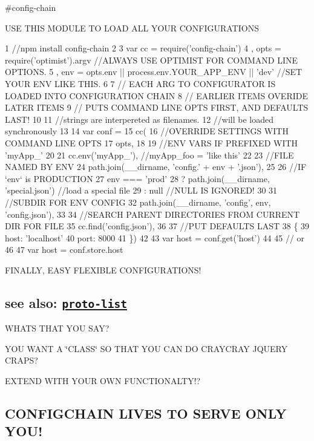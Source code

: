 \#config-\/chain

U\+S\+E T\+H\+I\+S M\+O\+D\+U\+L\+E T\+O L\+O\+A\+D A\+L\+L Y\+O\+U\+R C\+O\+N\+F\+I\+G\+U\+R\+A\+T\+I\+O\+N\+S


\begin{DoxyCode}
1 //npm install config-chain
2 
3 var cc = require('config-chain')
4   , opts = require('optimist').argv //ALWAYS USE OPTIMIST FOR COMMAND LINE OPTIONS.
5   , env = opts.env || process.env.YOUR\_APP\_ENV || 'dev' //SET YOUR ENV LIKE THIS.
6 
7 // EACH ARG TO CONFIGURATOR IS LOADED INTO CONFIGURATION CHAIN
8 // EARLIER ITEMS OVERIDE LATER ITEMS
9 // PUTS COMMAND LINE OPTS FIRST, AND DEFAULTS LAST!
10 
11 //strings are interpereted as filenames.
12 //will be loaded synchronously
13 
14 var conf =
15 cc(
16   //OVERRIDE SETTINGS WITH COMMAND LINE OPTS
17   opts,
18 
19   //ENV VARS IF PREFIXED WITH 'myApp\_'
20 
21   cc.env('myApp\_'), //myApp\_foo = 'like this'
22 
23   //FILE NAMED BY ENV
24   path.join(\_\_dirname,  'config.' + env + '.json'),
25 
26   //IF `env` is PRODUCTION
27   env === 'prod'
28     ? path.join(\_\_dirname, 'special.json') //load a special file
29     : null //NULL IS IGNORED!
30 
31   //SUBDIR FOR ENV CONFIG
32   path.join(\_\_dirname,  'config', env, 'config.json'),
33 
34   //SEARCH PARENT DIRECTORIES FROM CURRENT DIR FOR FILE
35   cc.find('config.json'),
36 
37   //PUT DEFAULTS LAST
38   \{
39     host: 'localhost'
40     port: 8000
41   \})
42 
43 var host = conf.get('host')
44 
45 // or
46 
47 var host = conf.store.host
\end{DoxyCode}


F\+I\+N\+A\+L\+L\+Y, E\+A\+S\+Y F\+L\+E\+X\+I\+B\+L\+E C\+O\+N\+F\+I\+G\+U\+R\+A\+T\+I\+O\+N\+S!

\subsection*{see also\+: \href{https://github.com/isaacs/proto-list/}{\tt proto-\/list}}

W\+H\+A\+T\+S T\+H\+A\+T Y\+O\+U S\+A\+Y?

Y\+O\+U W\+A\+N\+T A \char`\"{}\+C\+L\+A\+S\+S\char`\"{} S\+O T\+H\+A\+T Y\+O\+U C\+A\+N D\+O C\+R\+A\+Y\+C\+R\+A\+Y J\+Q\+U\+E\+R\+Y C\+R\+A\+P\+S?

E\+X\+T\+E\+N\+D W\+I\+T\+H Y\+O\+U\+R O\+W\+N F\+U\+N\+C\+T\+I\+O\+N\+A\+L\+T\+Y!?

\subsection*{C\+O\+N\+F\+I\+G\+C\+H\+A\+I\+N L\+I\+V\+E\+S T\+O S\+E\+R\+V\+E O\+N\+L\+Y Y\+O\+U!}


